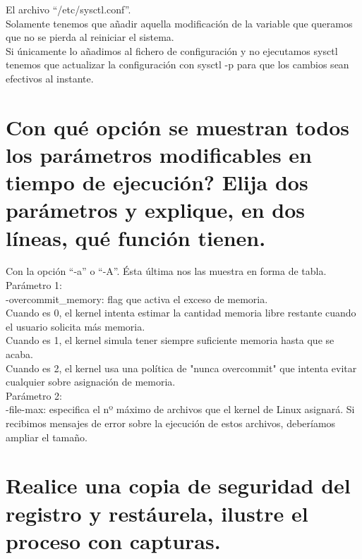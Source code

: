 El archivo “/etc/sysctl.conf”.\\
Solamente tenemos que añadir aquella modificación de la variable que queramos que no se pierda al reiniciar el sistema.\\

Si únicamente lo añadimos al fichero de configuración y no ejecutamos sysctl tenemos que actualizar la configuración con sysctl -p para que los cambios sean efectivos al instante.\\


\section{Con qué opción se muestran todos los parámetros modificables en tiempo de ejecución? Elija	dos parámetros y explique, en dos líneas, qué función tienen.}

Con la opción “-a” o “-A”. Ésta última nos las muestra en forma de tabla.\\
Parámetro 1:\\
-overcommit\_memory: flag que activa el exceso de memoria.\\
Cuando es 0, el kernel intenta estimar la cantidad memoria libre restante cuando el usuario solicita más memoria.\\
Cuando es 1, el kernel simula tener siempre suficiente memoria hasta que se acaba.\\
Cuando es 2, el kernel usa una política de "nunca overcommit" que intenta evitar cualquier sobre asignación de memoria.\\

Parámetro 2:\\
-file-max: especifica el nº máximo de archivos que el kernel de Linux asignará. Si recibimos mensajes de error sobre la ejecución de estos archivos, deberíamos ampliar el tamaño.\\

\clearpage
\section{Realice una copia de seguridad del registro y restáurela, ilustre el proceso con capturas.}

